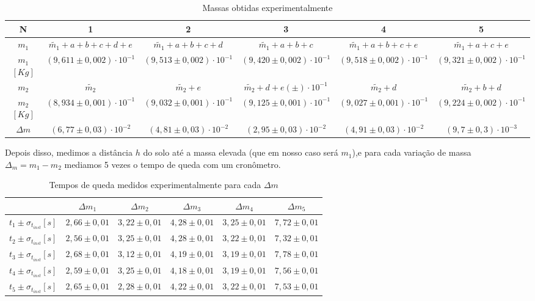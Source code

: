 \documentclass[a4paper]{article}
\providecommand{\tabularnewline}{\\} %
\begin{document}
\begin{table}[!ht]
	\begin{adjustwidth}{-2.2cm}{-1cm}
		\begin{centering}
		\caption{Massas obtidas experimentalmente}
		\par\end{centering}
		\centering{}%
		\begin{tabular}{|c|c|c|c|c|c|}
		\hline 
		N & 1 & 2 & 3 & 4 & 5\tabularnewline	\hline 
		$m_{1}$ & $\widetilde{m_{1}}+a+b+c+d+e$ & $\widetilde{m_{1}}+a+b+c+d$ & $\widetilde{m_{1}}+a+b+c$ & $\widetilde{m_{1}}+a+b+c+e$ & $\widetilde{m_{1}}+a+c+e$\tabularnewline		\hline 
		$m_{1}$$[Kg]$ & $(9,611\pm0,002)\cdot10^{-1}$ & $(9,513\pm0,002)\cdot10^{-1}$ & $(9,420\pm0,002)\cdot10^{-1}$ & $(9,518\pm0,002)\cdot10^{-1}$ & $(9,321\pm0,002)\cdot10^{-1}$\tabularnewline	\hline 
		$m_{2}$  & $\widetilde{m_{2}}$ & $\widetilde{m_{2}}+e$ & $\widetilde{m_{2}}+d+e$$(\pm)\cdot10^{-1}$ & $\widetilde{m_{2}}+d$ & $\widetilde{m_{2}}+b+d$\tabularnewline	\hline 
		$m_{2}$$[Kg]$ & $(8,934\pm0,001)\cdot10^{-1}$ & $(9,032\pm0,001)\cdot10^{-1}$ & $(9,125\pm0,001)\cdot10^{-1}$ & $(9,027\pm0,001)\cdot10^{-1}$ & $(9,224\pm0,002)\cdot10^{-1}$\tabularnewline	\hline 
		$\Delta m$ & $(6,77\pm0,03)\cdot10^{-2}$ & $(4,81\pm0,03)\cdot10^{-2}$ & $(2,95\pm0,03)\cdot10^{-2}$ & $(4,91\pm0,03)\cdot10^{-2}$ & $(9,7\pm0,3)\cdot10^{-3}$\tabularnewline	\hline 
		\end{tabular}
	\end{adjustwidth}
\end{table}

Depois disso, medimos a distância $h$ do solo até a massa elevada (que em nosso caso será $m_1$),e para cada variação de massa $\Delta_{m} = {m_1} - {m_2}$ mediamos 5 vezes o tempo de queda com um cronômetro.

\begin{table}[!ht]
	\begin{centering}
	\caption{Tempos de queda medidos experimentalmente para cada $\Delta m$}
	\par\end{centering}
	\centering{}%
	\begin{tabular}{|c|c|c|c|c|c|}
	\cline{2-6} 
	\multicolumn{1}{c|}{} & $\Delta m_{1}$ & $\Delta m_{2}$ & $\Delta m_{3}$ & $\Delta m_{4}$ & $\Delta m_{5}$\tabularnewline	\hline 
	$t_{1}\pm\sigma_{t_{inst}}$$[s]$ & $2,66\pm0,01$ & $3,22\pm0,01$ & $4,28\pm0,01$ & $3,25\pm0,01$ & $7,72\pm0,01$\tabularnewline		\hline		$t_{2}\pm\sigma_{t_{inst}}$$[s]$ & $2,56\pm0,01$ & $3,25\pm0,01$ & $4,28\pm0,01$ & $3,22\pm0,01$ & $7,32\pm0,01$\tabularnewline		\hline 
	$t_{3}\pm\sigma_{t_{inst}}$$[s]$ & $2,68\pm0,01$ & $3,12\pm0,01$ & $4,19\pm0,01$ & $3,19\pm0,01$ & $7,78\pm0,01$\tabularnewline		\hline 
	$t_{4}\pm\sigma_{t_{inst}}$$[s]$ & $2,59\pm0,01$ & $3,25\pm0,01$ & $4,18\pm0,01$ & $3,19\pm0,01$ & $7,56\pm0,01$\tabularnewline		\hline 
	$t_{5}\pm\sigma_{t_{inst}}$$[s]$ & $2,65\pm0,01$ & $2,28\pm0,01$ & $4,22\pm0,01$ & $3,22\pm0,01$ & $7,53\pm0,01$\tabularnewline		\hline 
	\end{tabular}
\end{table}
	
\end{document}
